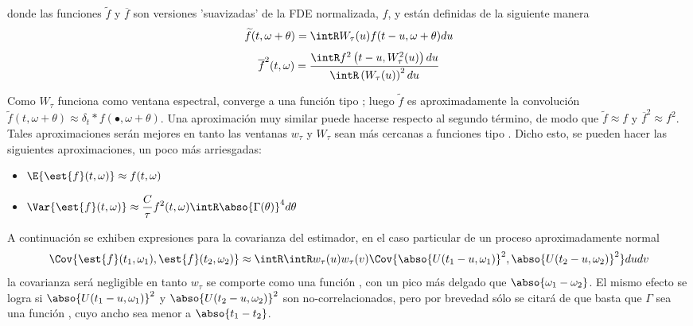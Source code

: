donde las funciones $\widetilde{f}$ y $\overline{f}$ son versiones 'suavizadas' de la FDE 
normalizada, $f$, y est\'an definidas de la siguiente manera
\begin{equation*}
\widetilde{f}(t,\omega+\theta) = 
\intR W_{\tau}(u) f(t-u,\omega+\theta) du
\end{equation*}
\begin{equation*}
\overline{f}^{2} (t,\omega) =
\frac{\intR f^{2}\left(t-u,W_{\tau}^{2}(u)\right) du}
{\intR \left( W_{\tau}(u) \right)^{2} du}
\end{equation*}

Como $W_{\tau}$ funciona como ventana espectral, converge a una 
funci\'on tipo \dirac; luego $\widetilde{f}$ es aproximadamente la convoluci\'on 
$\widetilde{f}(t,\omega+\theta) \approx \delta_t \ast f(\bullet,\omega+\theta)$. 
Una aproximaci\'on muy similar 
puede hacerse respecto al segundo t\'ermino, de modo que $\widetilde{f}\approx f$ y 
$\overline{f}^{2}\approx f^{2}$.
Tales aproximaciones ser\'an mejores en tanto las ventanas $w_{\tau}$ y $W_{\tau}$ sean m\'as 
cercanas a funciones tipo \dirac.
Dicho esto, se pueden hacer las siguientes aproximaciones, un poco m\'as arriesgadas:
\begin{itemize}
\item $\displaystyle \E{\est{f}(t,\omega)} \approx f(t,\omega)$
\item $\displaystyle \Var{\est{f}(t,\omega)} \approx 
\frac{C}{\tau} f^{2}(t,\omega) \intR \abso{\Gamma (\theta)}^{4} d\theta$
\end{itemize}

A continuaci\'on se exhiben expresiones para la covarianza del estimador, en el caso particular
de un proceso aproximadamente normal
\begin{equation*}
\Cov{\est{f}(t_1,\omega_1) , \est{f}(t_2,\omega_2)} \approx \intR \intR
w_\tau (u) w_\tau(v) \Cov{ \abso{U(t_1-u,\omega_1)}^{2} , \abso{U(t_2-u,\omega_2)}^{2} }
du dv
\end{equation*}
la covarianza ser\'a negligible en tanto $w_\tau$ se comporte como una 
funci\'on \dirac, con un pico m\'as delgado que $\abso{\omega_1-\omega_2}$.
El mismo efecto se logra si $\abso{U(t_1-u,\omega_1)}^{2}$ y $\abso{U(t_2-u,\omega_2)}^{2}$ son 
no-correlacionados, pero por brevedad s\'olo se citar\'a de \cite{Priestley65} que basta que 
$\Gamma$ sea una funci\'on \dirac, cuyo ancho sea menor a $\abso{t_1-t_2}$.

